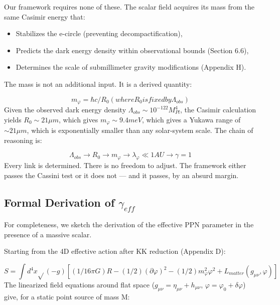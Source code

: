 \documentclass[aps,prd,preprint,superscriptaddress,longbibliography,floatfix]{revtex4-2}
\theoremstyle{remark}
\begin{document}
Our framework requires none of these. The scalar field acquires its mass from the same Casimir energy that:


\begin{itemize}
  \item Stabilizes the e-circle (preventing decompactification),
  \item Predicts the dark energy density within observational bounds (Section 6.6),
  \item Determines the scale of submillimeter gravity modifications (Appendix H).
\end{itemize}

The mass is not an additional input. It is a derived quantity:


\begin{equation}
    m_\varphi = \hbar c / R_{0}       (where R_{0} is fixed by \Lambda_{obs})
\end{equation}
Given the observed dark energy density $\Lambda_{obs} \sim  10^{-122} M_{Pl}^{4}$, the Casimir calculation yields $R_{0} \sim  21 \mu m$, which gives $m_\varphi \sim  9.4 meV$, which gives a Yukawa range of $\sim  21 \mu m$, which is exponentially smaller than any solar-system scale. The chain of reasoning is:


\begin{equation}
    \Lambda_{obs} \to R_{0} \to m_\varphi \to \lambda_\varphi \ll 1 AU \to \gamma = 1
\end{equation}
Every link is determined. There is no freedom to adjust. The framework either passes the Cassini test or it does not --- and it passes, by an absurd margin.



\subsection{Formal Derivation of $\gamma_{eff}$}

For completeness, we sketch the derivation of the effective PPN parameter in the presence of a massive scalar.

Starting from the 4D effective action after KK reduction (Appendix D):


\begin{equation}
    S = \int d^{4}x \sqrt{}(-g) [ (1/16\pi G) R - (1/2)(\partial\varphi)^{2} - (1/2) m_\varphi^{2} \varphi^{2} + L_{matter}(g_{\mu\nu}, \varphi) ]
\end{equation}
The linearized field equations around flat space ($g_{\mu\nu} = \eta_{\mu\nu} + h_{\mu\nu}$, $\varphi = \varphi_{0} + \delta\varphi$) give, for a static point source of mass M:
\end{document}
